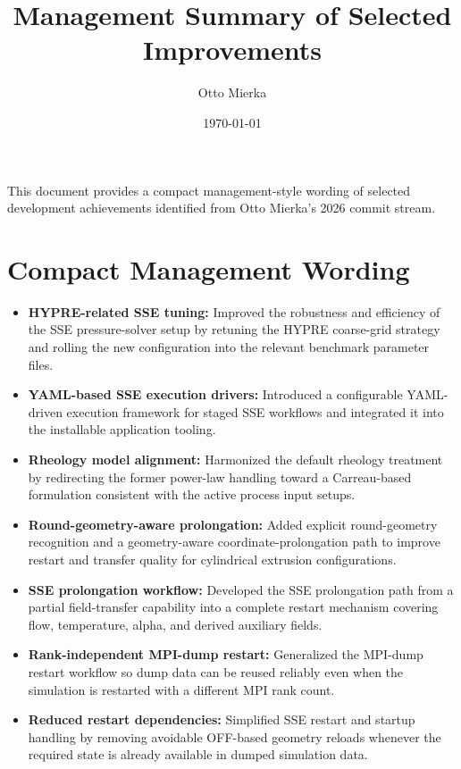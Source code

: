 \documentclass[11pt,a4paper]{article}
\title{Management Summary of Selected Improvements}
\author{Otto Mierka}
\date{\today}
\begin{document}
\maketitle

This document provides a compact management-style wording of selected development achievements identified from Otto Mierka's 2026 commit stream.

\section*{Compact Management Wording}
\begin{itemize}[leftmargin=*,itemsep=0.8em]
  \item \textbf{HYPRE-related SSE tuning:} Improved the robustness and efficiency of the SSE pressure-solver setup by retuning the HYPRE coarse-grid strategy and rolling the new configuration into the relevant benchmark parameter files.

  \item \textbf{YAML-based SSE execution drivers:} Introduced a configurable YAML-driven execution framework for staged SSE workflows and integrated it into the installable application tooling.

  \item \textbf{Rheology model alignment:} Harmonized the default rheology treatment by redirecting the former power-law handling toward a Carreau-based formulation consistent with the active process input setups.

  \item \textbf{Round-geometry-aware prolongation:} Added explicit round-geometry recognition and a geometry-aware coordinate-prolongation path to improve restart and transfer quality for cylindrical extrusion configurations.

  \item \textbf{SSE prolongation workflow:} Developed the SSE prolongation path from a partial field-transfer capability into a complete restart mechanism covering flow, temperature, alpha, and derived auxiliary fields.

  \item \textbf{Rank-independent MPI-dump restart:} Generalized the MPI-dump restart workflow so dump data can be reused reliably even when the simulation is restarted with a different MPI rank count.

  \item \textbf{Reduced restart dependencies:} Simplified SSE restart and startup handling by removing avoidable OFF-based geometry reloads whenever the required state is already available in dumped simulation data.


\end{itemize}
\end{document}
